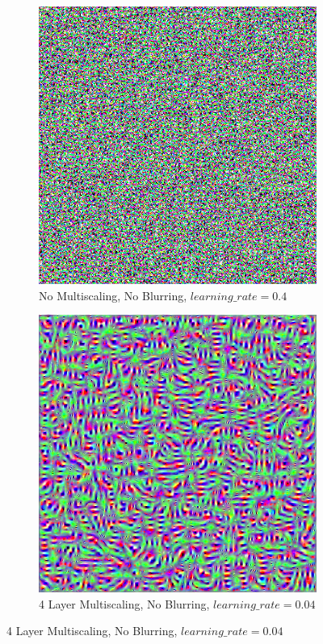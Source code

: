 \begin{figure}
    \captionsetup{justification=centering}

    \begin{subfigure}[t]{0.31\textwidth}
        \captionsetup{justification=centering}
        \centering
        \includegraphics[width=.7\linewidth]{figuras/feat_vis/experiments/initial/l3/random_image_pl1_lr4e-1_layer5_no-blur.png}
        \caption{No Multiscaling, No Blurring, \(learning\_rate = 0.4\)}
    \end{subfigure}
    \hfill
    \begin{subfigure}[t]{0.31\textwidth}
        \captionsetup{justification=centering}
        \centering
        \includegraphics[width=.7\linewidth]{figuras/feat_vis/experiments/initial/l3/random_image_pl4_lr4e-2_layer5_no-blur.png}
        \caption{4 Layer Multiscaling, No Blurring, \(learning\_rate = 0.04\)}

\end{subfigure}
\end{figure}
